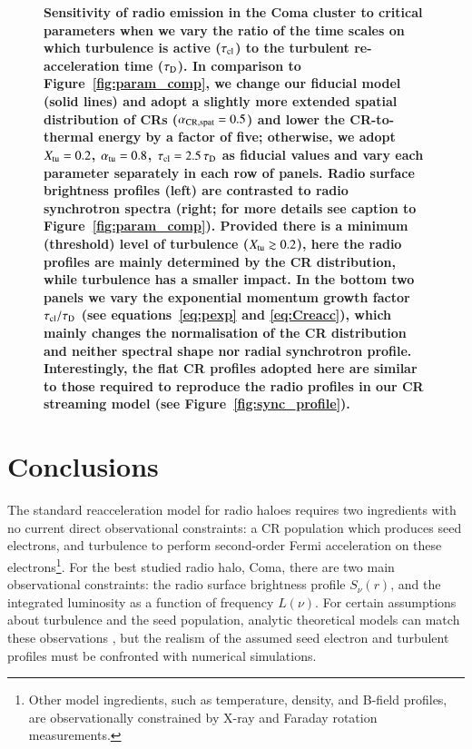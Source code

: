 \documentclass[fleqn,usenatbib,useAMS]{mnras}
\newcommand\C[1]{{\bf #1}}
\begin{document}
\begin{figure}
\begin{minipage}{1\columnwidth}
\begin{center}
   \end{center}
\end{minipage}
\caption{\C{Sensitivity of radio emission in the Coma cluster to critical
    parameters when we vary the ratio of the time scales on which turbulence is
    active ($\tau_{\rm cl}$) to the turbulent re-acceleration time ($\tau_{\rm
      D}$). In comparison to Figure~\ref{fig:param_comp}, we change our fiducial
    model (solid lines) and adopt a slightly more extended spatial distribution
    of CRs ($\alpha_{\rm CR, spat}=0.5$) and lower the CR-to-thermal energy by a
    factor of five; otherwise, we adopt $X_{\mathrm{tu}}=0.2$, $\alpha_{\mathrm{tu}}=0.8$,
    $\tau_{\rm cl}=2.5\,\tau_{\rm D}$ as fiducial values and vary each parameter
    separately in each row of panels. Radio surface brightness profiles (left)
    are contrasted to radio synchrotron spectra (right; for more details see
    caption to Figure~\ref{fig:param_comp}).  Provided there is a minimum
    (threshold) level of turbulence ($X_{\mathrm{tu}}\gtrsim0.2$), here the radio
    profiles are mainly determined by the CR distribution, while turbulence
    has a smaller impact. In the bottom two panels we vary the exponential
    momentum growth factor $\tau_{\rm cl}/\tau_{\rm D}$ (see
    equations~\ref{eq:pexp} and \ref{eq:Creacc}), which mainly changes the
    normalisation of the CR distribution and neither spectral shape nor radial
    synchrotron profile. Interestingly, the flat CR profiles adopted here are
    similar to those required to reproduce the radio profiles in our CR
    streaming model (see Figure~\ref{fig:sync_profile}).}}
  \label{fig:param_comp_tcl_tD}
\end{figure}

\section{Conclusions}
\label{sec:conclusions}

The standard reacceleration model for radio haloes requires two ingredients with
no current direct observational constraints: a CR population which produces seed
electrons, and turbulence to perform second-order Fermi acceleration on these
electrons\footnote{Other model ingredients, such as temperature, density, and
  B-field profiles, are observationally constrained by X-ray and Faraday
  rotation measurements.}. For the best studied radio halo, Coma, there are two
main observational constraints: the radio surface brightness profile
$S_{\nu}(r)$, and the integrated luminosity as a function of frequency
$L(\nu)$. For certain assumptions about turbulence and the seed population,
analytic theoretical models can match these observations \citep{brunetti11}, but
the realism of the assumed seed electron and turbulent profiles must be
confronted with numerical simulations.
\end{document}
